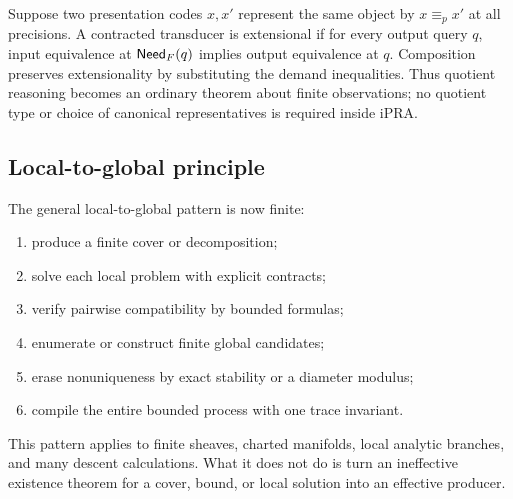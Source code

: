 Suppose two presentation codes \(x,x'\) represent the same object by
\(x\equiv_p x'\) at all precisions.  A contracted transducer is extensional if
for every output query \(q\), input equivalence at \(\mathsf{Need}_F(q)\) implies
output equivalence at \(q\).  Composition preserves extensionality by
substituting the demand inequalities.  Thus quotient reasoning becomes an
ordinary theorem about finite observations; no quotient type or choice of
canonical representatives is required inside iPRA.

\subsection{Local-to-global principle}

The general local-to-global pattern is now finite:
\begin{enumerate}
\item produce a finite cover or decomposition;
\item solve each local problem with explicit contracts;
\item verify pairwise compatibility by bounded formulas;
\item enumerate or construct finite global candidates;
\item erase nonuniqueness by exact stability or a diameter modulus;
\item compile the entire bounded process with one trace invariant.
\end{enumerate}
This pattern applies to finite sheaves, charted manifolds, local analytic
branches, and many descent calculations.  What it does not do is turn an
ineffective existence theorem for a cover, bound, or local solution into an
effective producer.
